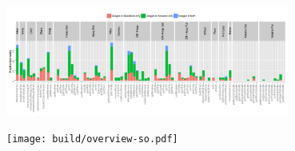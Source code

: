 \documentclass{article}
\begin{document}
\centering

\includegraphics[width=0.7\textwidth]{resources/legend-so}

\texttt{[image: build/overview-so.pdf]}
\end{document}
